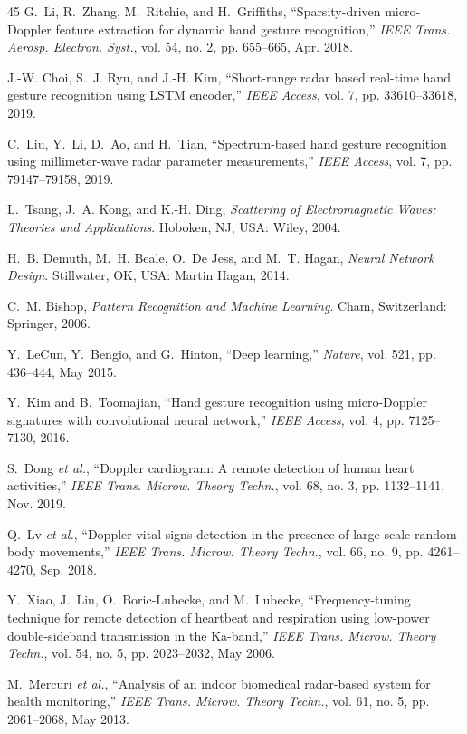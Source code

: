 \begin{TranslationNoMiniToc}
\begin{thebibliography}{45}
G.~Li, R.~Zhang, M.~Ritchie, and H.~Griffiths, ``Sparsity-driven micro-Doppler feature extraction for dynamic hand gesture recognition,'' \emph{IEEE Trans. Aerosp. Electron. Syst.}, vol. 54, no. 2, pp. 655--665, Apr. 2018.

J.-W. Choi, S.~J. Ryu, and J.-H. Kim, ``Short-range radar based real-time hand gesture recognition using LSTM encoder,'' \emph{IEEE Access}, vol. 7, pp. 33610--33618, 2019.

C.~Liu, Y.~Li, D.~Ao, and H.~Tian, ``Spectrum-based hand gesture recognition using millimeter-wave radar parameter measurements,'' \emph{IEEE Access}, vol. 7, pp. 79147--79158, 2019.

L.~Tsang, J.~A. Kong, and K.-H. Ding, \emph{Scattering of Electromagnetic Waves: Theories and Applications}. Hoboken, NJ, USA: Wiley, 2004.

H.~B. Demuth, M.~H. Beale, O.~De Jess, and M.~T. Hagan, \emph{Neural Network Design}. Stillwater, OK, USA: Martin Hagan, 2014.

C.~M. Bishop, \emph{Pattern Recognition and Machine Learning}. Cham, Switzerland: Springer, 2006.

Y.~LeCun, Y.~Bengio, and G.~Hinton, ``Deep learning,'' \emph{Nature}, vol. 521, pp. 436--444, May 2015.

Y.~Kim and B.~Toomajian, ``Hand gesture recognition using micro-Doppler signatures with convolutional neural network,'' \emph{IEEE Access}, vol. 4, pp. 7125--7130, 2016.

S.~Dong \emph{et al.}, ``Doppler cardiogram: A remote detection of human heart activities,'' \emph{IEEE Trans. Microw. Theory Techn.}, vol. 68, no. 3, pp. 1132--1141, Nov. 2019.

Q.~Lv \emph{et al.}, ``Doppler vital signs detection in the presence of large-scale random body movements,'' \emph{IEEE Trans. Microw. Theory Techn.}, vol. 66, no. 9, pp. 4261--4270, Sep. 2018.

Y.~Xiao, J.~Lin, O.~Boric-Lubecke, and M.~Lubecke, ``Frequency-tuning technique for remote detection of heartbeat and respiration using low-power double-sideband transmission in the Ka-band,'' \emph{IEEE Trans. Microw. Theory Techn.}, vol. 54, no. 5, pp. 2023--2032, May 2006.

M.~Mercuri \emph{et al.}, ``Analysis of an indoor biomedical radar-based system for health monitoring,'' \emph{IEEE Trans. Microw. Theory Techn.}, vol. 61, no. 5, pp. 2061--2068, May 2013.


\end{thebibliography}
\end{TranslationNoMiniToc}
